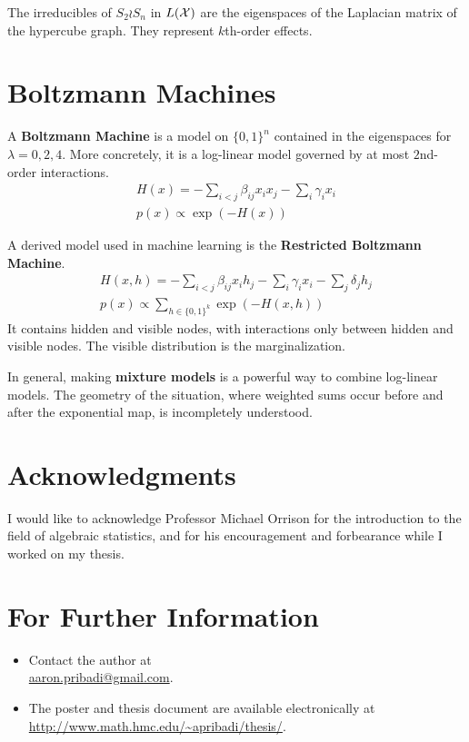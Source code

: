 \documentclass[thesis]{hmcposter}
\newcommand{\mterm}[1]{\textbf{\textcolor{cterm}{#1}}}
\newcommand*{\halfspace}{\vspace{0.5\baselineskip}}
\newcommand*{\nhalfspace}{\vspace{-0.5\baselineskip}}
\begin{document}
\begin{poster}
The irreducibles of $S_2 \wr S_n$ in $L(\mathcal{X})$ are the eigenspaces of the
Laplacian matrix of the hypercube graph.  They represent $k$th-order effects.

\halfspace


\section{Boltzmann Machines}
\nhalfspace

A \mterm{Boltzmann Machine} is a model on $\{0, 1\}^n$ contained in the
eigenspaces for $\lambda = 0,2,4$.  More concretely, it is a log-linear model
governed by at most $2$nd-order interactions.
\begin{gather*}
    H(x) = -\sum_{i < j} \beta_{ij} x_i x_j - \sum_i \gamma_i x_i \\
    p(x) \propto \exp(-H(x))
\end{gather*}

A derived model used in machine learning is the \mterm{Restricted Boltzmann
Machine}.
\begin{gather*}
    H(x, h) = -\sum_{i < j} \beta_{ij} x_i h_j - \sum_i \gamma_i x_i - \sum_j
    \delta_j h_j\\
    p(x) \propto \sum_{h \in \{0, 1\}^k}\exp(-H(x, h))
\end{gather*}
It contains hidden and visible nodes, with interactions only between hidden
and visible nodes.  The visible distribution is the marginalization.

In general, making \mterm{mixture models} is a powerful way to combine
log-linear models.  The geometry of the situation, where weighted sums occur
before and after the exponential map, is incompletely understood.

%
%

\section{Acknowledgments}
\nhalfspace

I would like to acknowledge Professor Michael Orrison for the introduction to
the field of algebraic statistics, and for his encouragement and forbearance
while I worked on my thesis.

\section{For Further Information}
\nhalfspace

\begin{itemize}
\item Contact the author at \\\mbox{\url{aaron.pribadi@gmail.com}}.
\item The poster and thesis document are available electronically at
\url{http://www.math.hmc.edu/~apribadi/thesis/}.
\end{itemize}


\end{poster}
\end{document}
